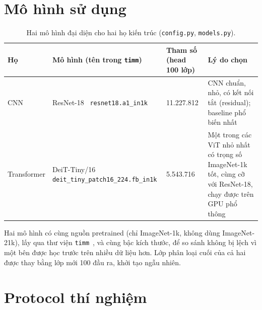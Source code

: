 \documentclass[12pt]{article}
\newcommand{\code}[1]{\texttt{#1}}
\begin{document}
\section{Mô hình sử dụng}
\begin{table}[H]
\centering
\caption{Hai mô hình đại diện cho hai họ kiến trúc (\code{config.py}, \code{models.py}).}\label{tab:models}
\begin{tabularx}{\linewidth}{@{}P{2.5cm}P{4.6cm}P{2.2cm}L@{}}
\toprule
Họ & Mô hình (tên trong \code{timm}) & Tham số (head 100 lớp) & Lý do chọn \\\midrule
CNN & ResNet-18~\cite{he2016} \newline \code{resnet18.a1\_in1k} & 11.227.812 & CNN chuẩn, nhỏ, có kết nối tắt (residual); baseline phổ biến nhất \\
Transformer & DeiT-Tiny/16~\cite{touvron2021} \newline \code{deit\_tiny\_patch16\_224}\newline\code{.fb\_in1k} & 5.543.716 & Một trong các ViT nhỏ nhất có trọng số ImageNet-1k tốt, cùng cỡ với ResNet-18, chạy được trên GPU phổ thông \\
\bottomrule
\end{tabularx}
\end{table}

Hai mô hình có cùng nguồn pretrained (chỉ ImageNet-1k, không dùng ImageNet-21k), lấy qua thư viện
\code{timm}~\cite{timm}, và cùng bậc kích thước, để so sánh không bị lệch vì một bên được học trước trên nhiều dữ liệu hơn.
Lớp phân loại cuối của cả hai được thay bằng lớp mới 100 đầu ra, khởi tạo ngẫu nhiên.

\section{Protocol thí nghiệm}
\end{document}
